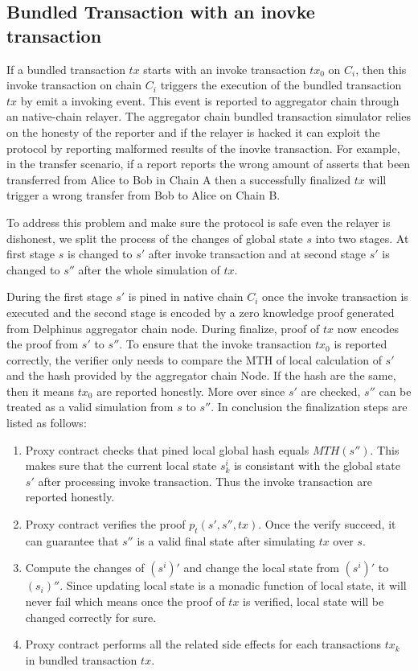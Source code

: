 \documentclass[pageno]{jpaper}
\begin{document}
\subsection{Bundled Transaction with an inovke transaction}
If a bundled transaction $tx$ starts with an invoke transaction $tx_0$ on $C_i$, then this invoke transaction on chain $C_i$ triggers the execution of the bundled transaction $tx$ by emit a invoking event. This event is reported to aggregator chain through an native-chain relayer. The aggregator chain bundled transaction simulator relies on the honesty of the reporter and if the relayer is hacked it can exploit the protocol by reporting malformed results of the inovke transaction. For example, in the transfer scenario, if a report reports the wrong amount of asserts that been transferred from Alice to Bob in Chain A then a successfully finalized $tx$ will trigger a wrong transfer from Bob to Alice on Chain B.

To address this problem and make sure the protocol is safe even the relayer is dishonest, we split the process of the changes of global state $s$ into two stages. At first stage $s$ is changed to $s'$ after invoke transaction and at second stage $s'$ is changed to $s''$ after the whole simulation of $tx$.

During the first stage $s'$ is pined in native chain $C_i$ once the invoke transaction is executed and the second stage is encoded by a zero knowledge proof generated from Delphinus aggregator chain  node. During finalize, proof of $tx$ now encodes the proof from $s'$ to $s''$. To ensure that the invoke transaction $tx_0$ is reported correctly, the verifier only needs to compare the MTH of local calculation of $s'$ and the hash provided by the aggregator chain Node. If the hash are the same, then it means $tx_0$ are reported honestly. More over since $s'$ are checked, $s''$ can be treated as a valid simulation from $s$ to $s''$. In conclusion the finalization steps are listed as follows:

\begin{enumerate}[leftmargin=*]
\item Proxy contract checks that pined local global hash equals $MTH(s'')$. This makes sure that the current local state $s_k^i$ is consistant with the global state $s'$ after processing invoke transaction. Thus the invoke transaction are reported honestly.

\item Proxy contract verifies the proof $p_{t}(s', s'', tx)$. Once the verify succeed, it can guarantee that $s''$ is a valid final state after simulating $tx$ over $s$.

\item Compute the changes of $(s^i)'$ and change the local state from $(s^i)'$ to $(s_i)''$. Since updating local state is a monadic function of local state, it will never fail which means once the proof of $tx$ is verified, local state will be changed correctly for sure.

\item Proxy contract performs all the related side effects for each transactions $tx_k$ in bundled transaction $tx$. 
\end{enumerate}
\end{document}
